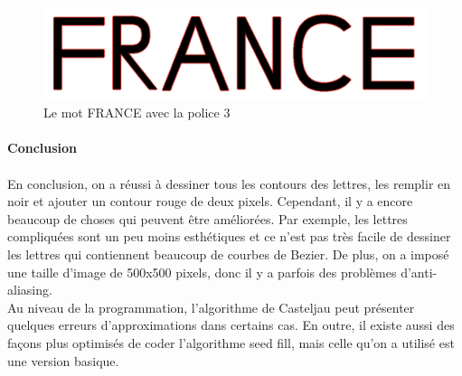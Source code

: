 \documentclass[a4paper, 12pt]{article}
\begin{document}
\begin{figure}[h]
\centering
\includegraphics[scale=0.6]{Images/FRANCE_FontV3.jpeg}
\caption{Le mot FRANCE avec la police 3}
\label{fig7}
\end{figure}
 
\newpage
{} %
	\vspace*{3cm}
	\paragraph{\Huge{Conclusion}}

	\paragraph{}
	En conclusion, on a réussi à dessiner tous les contours des lettres, les remplir en noir et ajouter un contour rouge de deux pixels. Cependant, il y a encore beaucoup de choses qui peuvent être améliorées. Par exemple, les lettres compliquées sont un peu moins esthétiques et ce n’est pas très facile de dessiner les lettres qui contiennent beaucoup de courbes de Bezier. De plus, on a imposé une taille d'image de 500x500 pixels, donc il y a parfois des problèmes d'anti-aliasing.\\
	
	Au niveau de la programmation, l'algorithme de Casteljau peut présenter quelques erreurs d'approximations dans certains cas. En outre, il existe aussi des façons plus optimisés de coder l'algorithme seed fill, mais celle qu'on a utilisé est une version basique. 
\end{document}
